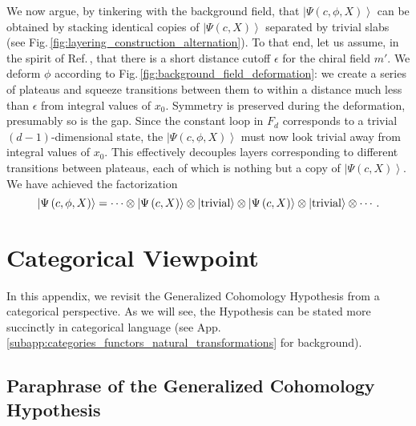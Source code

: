 \documentclass[sort&compress]{elsarticle}
\theoremstyle{theoremstyle}
\theoremstyle{framedtheoremstyle}
\theoremstyle{definitionstyle}
\theoremstyle{definitionstyle}
\theoremstyle{definitionstyle}
\theoremstyle{definitionstyle}
\theoremstyle{nameddefinitionstyle}
\theoremstyle{framednameddefinitionstyle}
\theoremstyle{proofstyle}
\theoremstyle{definitionstyle}
\newcommand{\paren}[1]{\left( #1 \right)}
\newcommand{\ket}[1]{\left|#1\right\rangle}
\begin{document}
\begin{appendices}
We now argue, by tinkering with the background field, that $\ket{\Psi\paren{c,\phi, X}}$ can be obtained by stacking identical copies of $\ket{\Psi\paren{c, X}}$ separated by trivial slabs (see Fig.\,\ref{fig:layering_construction_alternation}). To that end, let us assume, in the spirit of Ref.\,\cite{Kitaev_IPAM}, that there is a short distance cutoff $\epsilon$ for the chiral field $m'$. We deform $\phi$ according to Fig.\,\ref{fig:background_field_deformation}: we create a series of plateaus and squeeze transitions between them to within a distance much less than $\epsilon$ from integral values of $x_0$. Symmetry is preserved during the deformation, presumably so is the gap. Since the constant loop in $F_d$ corresponds to a trivial $(d-1)$-dimensional state, the $\ket{\Psi\paren{c,\phi, X}}$ must now look trivial away from integral values of $x_0$. This effectively decouples layers corresponding to different transitions between plateaus, each of which is nothing but a copy of $\ket{\Psi\paren{c, X}}$. We have achieved the factorization
\begin{equation}
\ket{\Psi\paren{c,\phi, X}} = \cdots \otimes \ket{\Psi\paren{c, X}} \otimes \ket{\rm trivial} \otimes \ket{\Psi\paren{c, X}} \otimes \ket{\rm trivial} \otimes \cdots.
\end{equation}


















\section{Categorical Viewpoint\label{app:categorical_viewpoint}}

In this appendix, we revisit the Generalized Cohomology Hypothesis from a categorical perspective. As we will see, the Hypothesis can be stated more succinctly in categorical language (see App.\,\ref{subapp:categories_functors_natural_transformations} for background).





\subsection{Paraphrase of the Generalized Cohomology Hypothesis\label{subapp:paraphrase_generalized_cohomology_hypothesis}}


\end{appendices}
\end{document}
